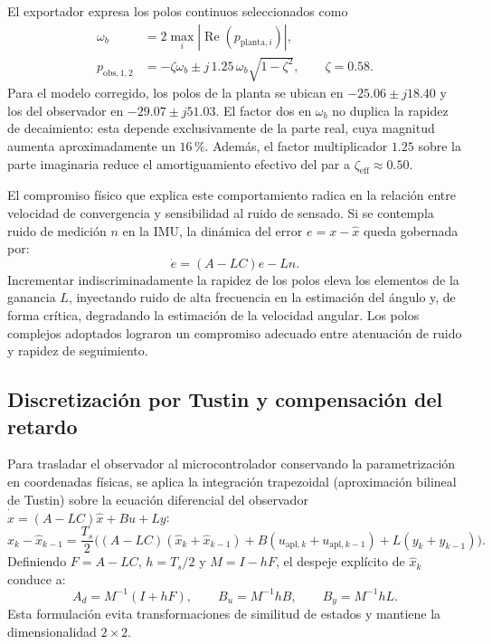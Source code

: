 \documentclass[a4paper, twoside, 10pt, spanish]{article}
\numberwithin{table}{section}
\begin{document}
El exportador expresa los polos continuos seleccionados como
\begin{align}
\omega_b &= 2\max_i |\operatorname{Re}(p_{\mathrm{planta},i})|, \\
p_{\mathrm{obs},1,2} &= -\zeta\omega_b \pm j\,1.25\,\omega_b\sqrt{1-\zeta^2}, \qquad \zeta=0.58.
\end{align}
Para el modelo corregido, los polos de la planta se ubican en $-25.06 \pm j18.40$ y los del observador en $-29.07 \pm j51.03$. El factor dos en $\omega_b$ no duplica la rapidez de decaimiento: esta depende exclusivamente de la parte real, cuya magnitud aumenta aproximadamente un $16\,\%$. Además, el factor multiplicador $1.25$ sobre la parte imaginaria reduce el amortiguamiento efectivo del par a $\zeta_{\mathrm{eff}} \approx 0.50$.

El compromiso físico que explica este comportamiento radica en la relación entre velocidad de convergencia y sensibilidad al ruido de sensado. Si se contempla ruido de medición $n$ en la IMU, la dinámica del error $e = x - \hat x$ queda gobernada por:
\begin{equation}
\dot e = (A - LC)e - Ln.
\end{equation}
Incrementar indiscriminadamente la rapidez de los polos eleva los elementos de la ganancia $L$, inyectando ruido de alta frecuencia en la estimación del ángulo y, de forma crítica, degradando la estimación de la velocidad angular. Los polos complejos adoptados lograron un compromiso adecuado entre atenuación de ruido y rapidez de seguimiento.

\subsection{Discretización por Tustin y compensación del retardo}
Para trasladar el observador al microcontrolador conservando la parametrización en coordenadas físicas, se aplica la integración trapezoidal (aproximación bilineal de Tustin) sobre la ecuación diferencial del observador $\dot{\hat x} = (A - LC)\hat x + Bu + Ly$:
\begin{equation}
\hat x_k - \hat x_{k-1} = \frac{T_s}{2}\Big( (A - LC)(\hat x_k + \hat x_{k-1}) + B(u_{\mathrm{apl},k} + u_{\mathrm{apl},k-1}) + L(y_k + y_{k-1}) \Big).
\end{equation}
Definiendo $F = A - LC$, $h = T_s/2$ y $M = I - hF$, el despeje explícito de $\hat x_k$ conduce a:
\begin{equation}
A_d = M^{-1}(I + hF), \qquad B_u = M^{-1}hB, \qquad B_y = M^{-1}hL.
\end{equation}
Esta formulación evita transformaciones de similitud de estados y mantiene la dimensionalidad $2 \times 2$.
\end{document}
